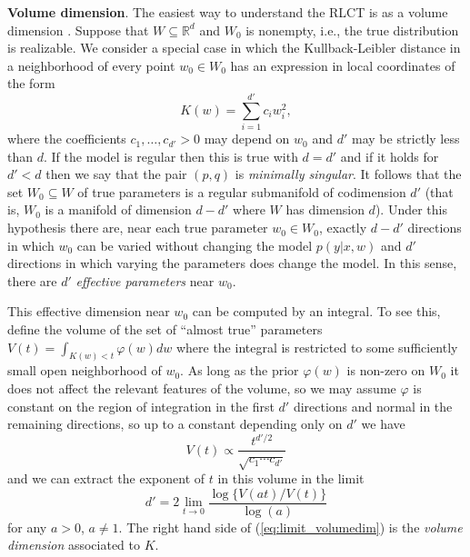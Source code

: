 \documentclass{article} %
\def\be{\begin{equation}}
\def\ee{\end{equation}}
\begin{document}
\textbf{Volume dimension}. The easiest way to understand the RLCT is as a volume dimension \citep[Theorem 7.1]{watanabe_algebraic_2009}.  Suppose that $W \subseteq \mathbb{R}^d$ and $W_0$ is nonempty, i.e., the true distribution is realizable. We consider a special case in which the Kullback-Leibler distance in a neighborhood of every point $w_0 \in W_0$ has an expression in local coordinates of the form
\begin{equation}\label{eq:local_Kw}
K(w) = \sum_{i=1}^{d'} c_i w_i^2,
\end{equation} %
where the coefficients $c_1,\ldots,c_{d'} > 0$ may depend on $w_0$ and $d'$ may be strictly less than $d$. If the model is regular then this is true with $d = d'$ and if it holds for $d' < d$ then we say that the pair $(p,q)$ is \emph{minimally singular}. It follows that the set $W_0 \subseteq W$ of true parameters is a regular submanifold of codimension $d'$ (that is, $W_0$ is a manifold of dimension $d - d'$ where $W$ has dimension $d$). Under this hypothesis there are, near each true parameter $w_0 \in W_0$, exactly $d - d'$ directions in which $w_0$ can be varied without changing the model $p(y|x,w)$ and $d'$ directions in which varying the parameters does change the model. In this sense, there are $d'$ \emph{effective parameters} near $w_0$. 

This effective dimension near $w_0$ can be computed by an integral. To see this, define the volume of the set of ``almost true'' parameters
$
V(t) = \int_{K(w) < t} \varphi(w) dw
$
where the integral is restricted to some sufficiently small open neighborhood of $w_0$. As long as the prior $\varphi(w)$ is non-zero on $W_0$ it does not affect the relevant features of the volume, so we may assume $\varphi$ is constant on the region of integration in the first $d'$ directions and normal in the remaining directions, so up to a constant depending only on $d'$ we have
\begin{equation}\label{eq:volume_singular}
V(t) \propto \frac{t^{d'/2}}{\sqrt{c_1 \cdots c_{d'}}}
\end{equation}
and we can extract the exponent of $t$ in this volume in the limit
\be\label{eq:limit_volumedim}
d' = 2 \lim_{t \to 0} \frac{\log\big\{V(at)/V(t)\big\}}{\log(a)}
\ee
for any $a > 0$, $a \neq 1$. The right hand side of (\ref{eq:limit_volumedim}) is the \emph{volume dimension} associated to $K$. 
\end{document}
